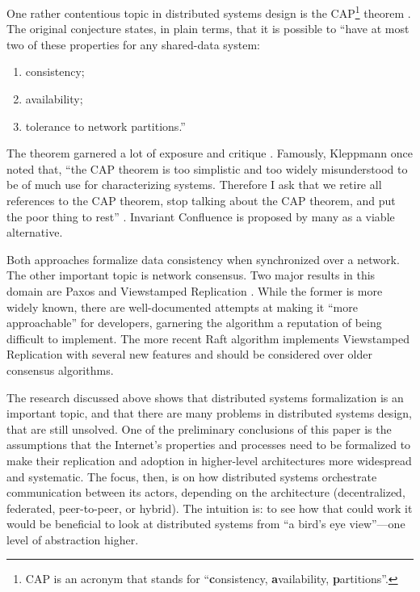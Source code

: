 \documentclass{article}
\begin{document}
One rather contentious topic in distributed systems design is the CAP\footnote{CAP is an acronym that stands for “\textbf{c}onsistency, \textbf{a}vailability, \textbf{p}artitions”.} theorem \cite{Gilbert}. The
original conjecture \cite{Brewer} states, in plain terms, that it is possible to “have at most two of these
properties for any shared-data system:
\begin{enumerate}[-]
    \item consistency;
    \item availability;
    \item tolerance to network partitions.”
\end{enumerate}
The theorem garnered a lot of exposure and critique \cite{Kleppmann1,Tornow}. Famously, Kleppmann once
noted that, “the CAP theorem is too simplistic and too widely misunderstood to be of much use
for characterizing systems. Therefore I ask that we retire all references to the CAP theorem, stop
talking about the CAP theorem, and put the poor thing to rest” \cite{Kleppmann2}. Invariant Confluence \cite{Bailis} is
proposed by many as a viable alternative.

Both approaches formalize data consistency when synchronized over a network. The other
important topic is network consensus. Two major results in this domain are Paxos \cite{Lamport} and
Viewstamped Replication \cite{Oki}. While the former is more widely known, there are well-documented
attempts at making it “more approachable” for developers, garnering the algorithm a reputation of
being difficult to implement. The more recent Raft algorithm implements Viewstamped Replication
with several new features \cite{Ongaro} and should be considered over older consensus algorithms.

The research discussed above shows that distributed systems formalization is an important
topic, and that there are many problems in distributed systems design, that are still unsolved. One
of the preliminary conclusions of this paper is the assumptions that the Internet’s properties and
processes need to be formalized to make their replication and adoption in higher-level architectures
more widespread and systematic. The focus, then, is on how distributed systems orchestrate
communication between its actors, depending on the architecture (decentralized, federated, peer-to-peer, or hybrid). The intuition is: to see how that could work it would be beneficial to look at
distributed systems from “a bird’s eye view”---one level of abstraction higher.
\end{document}
